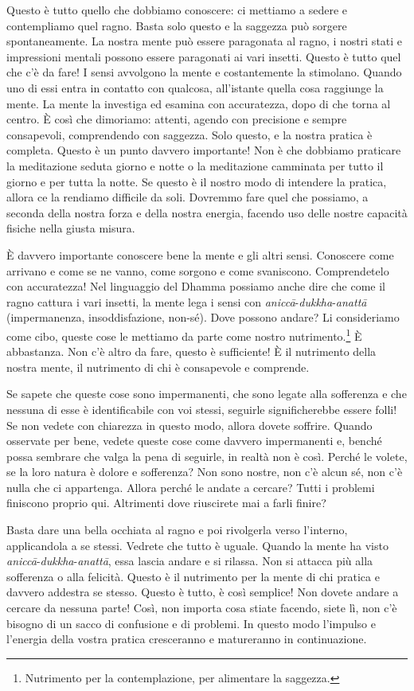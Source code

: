 Questo è tutto quello che dobbiamo conoscere: ci mettiamo a sedere e
contempliamo quel ragno. Basta solo questo e la saggezza può sorgere
spontaneamente. La nostra mente può essere paragonata al ragno, i nostri
stati e impressioni mentali possono essere paragonati ai vari insetti.
Questo è tutto quel che c'è da fare! I sensi avvolgono la mente e
costantemente la stimolano. Quando uno di essi entra in contatto con
qualcosa, all'istante quella cosa raggiunge la mente. La mente la
investiga ed esamina con accuratezza, dopo di che torna al centro. È
così che dimoriamo: attenti, agendo con precisione e sempre consapevoli,
comprendendo con saggezza. Solo questo, e la nostra pratica è completa.
Questo è un punto davvero importante! Non è che dobbiamo praticare la
meditazione seduta giorno e notte o la meditazione camminata per tutto
il giorno e per tutta la notte. Se questo è il nostro modo di intendere
la pratica, allora ce la rendiamo difficile da soli. Dovremmo fare quel
che possiamo, a seconda della nostra forza e della nostra energia,
facendo uso delle nostre capacità fisiche nella giusta misura.

È davvero importante conoscere bene la mente e gli altri sensi.
Conoscere come arrivano e come se ne vanno, come sorgono e come
svaniscono. Comprendetelo con accuratezza! Nel linguaggio del Dhamma
possiamo anche dire che come il ragno cattura i vari insetti, la mente
lega i sensi con \emph{aniccā}-\emph{dukkha}-\emph{anattā}
(impermanenza, insoddisfazione, non-sé). Dove possono andare? Li
consideriamo come cibo, queste cose le mettiamo da parte come nostro
nutrimento.\footnote{Nutrimento per la contemplazione, per alimentare la
  saggezza.} È abbastanza. Non c'è altro da fare, questo è sufficiente!
È il nutrimento della nostra mente, il nutrimento di chi è consapevole e
comprende.

Se sapete che queste cose sono impermanenti, che sono legate alla
sofferenza e che nessuna di esse è identificabile con voi stessi,
seguirle significherebbe essere folli! Se non vedete con chiarezza in
questo modo, allora dovete soffrire. Quando osservate per bene, vedete
queste cose come davvero impermanenti e, benché possa sembrare che valga
la pena di seguirle, in realtà non è così. Perché le volete, se la loro
natura è dolore e sofferenza? Non sono nostre, non c'è alcun sé, non c'è
nulla che ci appartenga. Allora perché le andate a cercare? Tutti i
problemi finiscono proprio qui. Altrimenti dove riuscirete mai a farli
finire?

Basta dare una bella occhiata al ragno e poi rivolgerla verso l'interno,
applicandola a se stessi. Vedrete che tutto è uguale. Quando la mente ha
visto \emph{aniccā}-\emph{dukkha}-\emph{anattā}, essa lascia andare e si
rilassa. Non si attacca più alla sofferenza o alla felicità. Questo è il
nutrimento per la mente di chi pratica e davvero addestra se stesso.
Questo è tutto, è così semplice! Non dovete andare a cercare da nessuna
parte! Così, non importa cosa stiate facendo, siete lì, non c'è bisogno
di un sacco di confusione e di problemi. In questo modo l'impulso e
l'energia della vostra pratica cresceranno e matureranno in
continuazione.

